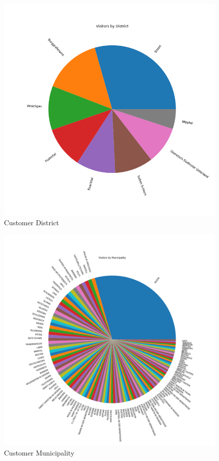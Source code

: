 \documentclass[letterpaper,12pt]{article}
\begin{document}
\begin{figure}[H] 
        \centering
        \includegraphics[width=\columnwidth]{../images/district.png}
        \caption{
                \label{fig:district}  
                Customer District
        }
\end{figure}

\begin{figure}[H] 
        \centering
        \includegraphics[width=\columnwidth]{../images/municipality.png}
        \caption{
                \label{fig:municipality}  
                Customer Municipality
        }
\end{figure}
\end{document}
